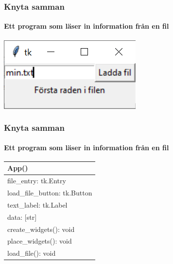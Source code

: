\documentclass[aspectratio=169]{beamer}
\begin{document}
\begin{frame}[fragile]
	\frametitle{Knyta samman}
	\framesubtitle{Ett program som läser in information från en fil}
	
	\centering
	\includegraphics{exempel.png}
	
\end{frame}

\begin{frame}
	\frametitle{Knyta samman}
	\framesubtitle{Ett program som läser in information från en fil}
	
	\centering
	
	\begin{tabular}{|l|}
		\hline
		\textbf{App()} \\ \hline
		file\_entry: tk.Entry\\
		load\_file\_button: tk.Button\\
		text\_label: tk.Label\\
		data: [str]\\ \hline
		create\_widgets(): void\\
		place\_widgets(): void\\
		load\_file(): void\\ \hline
	\end{tabular}

\end{frame}
\end{document}

